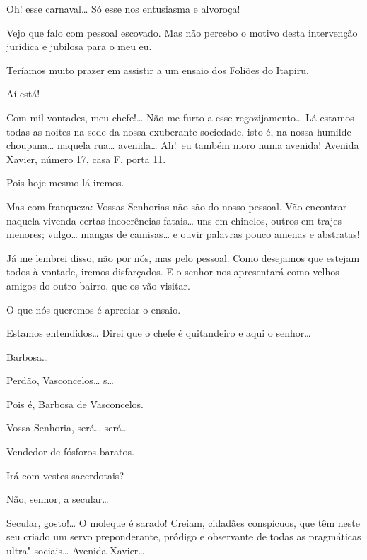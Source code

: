   
Oh! esse carnaval\ldots{} Só esse nos
entusiasma e alvoroça!

 Vejo que falo
com pessoal escovado. Mas não percebo o motivo desta
intervenção jurídica e jubilosa para o meu eu.

 Teríamos muito
prazer em assistir a um ensaio dos Foliões
do Itapiru.

 Aí está!

 Com mil
vontades, meu chefe!\ldots{} Não me furto a esse
regozijamento\ldots{} Lá estamos todas as noites na sede
da nossa exuberante sociedade, isto é, na nossa
humilde choupana\ldots{} naquela rua\ldots{} avenida\ldots{} Ah!~eu também
moro numa avenida! Avenida Xavier, número
17, casa F, porta 11.

 Pois hoje mesmo lá
iremos.

 Mas com
franqueza: Vossas Senhorias não são do nosso pessoal.
Vão encontrar naquela vivenda certas
incoerências fatais\ldots{} uns em chinelos, outros em
trajes menores; vulgo\ldots{} mangas de camisas\ldots{} e ouvir palavras pouco
amenas e abstratas!

 Já me lembrei
disso, não por nós, mas pelo pessoal. Como desejamos
que estejam todos à vontade, iremos
disfarçados. E o senhor nos apresentará
como velhos amigos do outro bairro, que os vão
visitar.

 O que nós queremos é
apreciar o ensaio.

 Estamos
entendidos\ldots{} Direi que o chefe é quitandeiro e aqui
o senhor\ldots{}

  
Barbosa\ldots{}

 Perdão,
Vasconcelos\ldots{} s\ldots{}

 
Pois é, Barbosa de
Vasconcelos.

 Vossa Senhoria,
será\ldots{} será\ldots{}

 Vendedor de fósforos baratos.

 Irá com vestes
sacerdotais?

 Não, senhor, a secular\ldots{}

 Secular,
gosto!\ldots{} O moleque é sarado! 
Creiam, cidadães conspícuos,
que têm neste seu criado um servo
preponderante, pródigo e observante de todas as
pragmáticas ultra"-sociais\ldots{} Avenida Xavier\ldots{}

